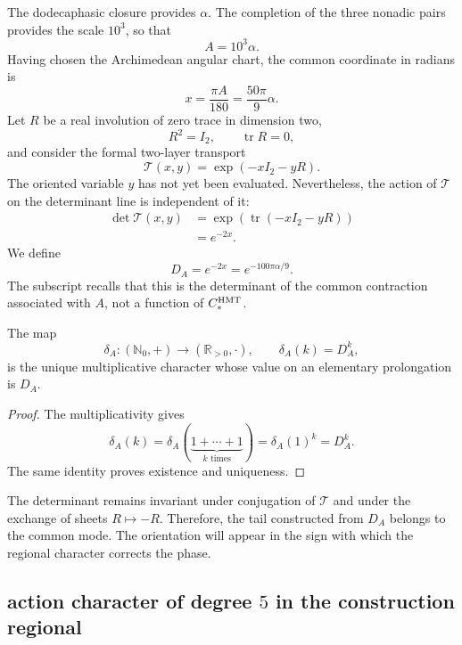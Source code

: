 
The dodecaphasic closure provides \(\alpha\). The completion of the three
nonadic pairs provides the scale \(10^3\), so that
\[
A=10^3\alpha.
\]
Having chosen the Archimedean angular chart, the common coordinate in radians is
\[
x=\frac{\pi A}{180}=\frac{50\pi}{9}\alpha.
\]
Let \(R\) be a real involution of zero trace in dimension two,
\[
R^2=I_2,
\qquad
\operatorname{tr}R=0,
\]
and consider the formal two-layer transport
\[
\mathcal T(x,y)=\exp(-xI_2-yR).
\]
The oriented variable \(y\) has not yet been evaluated. Nevertheless, the action
of \(\mathcal T\) on the determinant line is independent of it:
\[
\begin{aligned}
\det\mathcal T(x,y)
&=\exp\!\left(\operatorname{tr}(-xI_2-yR)\right)\\
&=e^{-2x}.
\end{aligned}
\]
We define
\[
\boxed{
D_A=e^{-2x}=e^{-100\pi\alpha/9}.}
\]
The subscript recalls that this is the determinant of the common contraction
associated with \(A\), not a function of \(C_*^{\rm HMT}\).

\begin{proposition}
\label{p3-83-c30-s1:prop:caracter-determinante}
The map
\[
\delta_A:(\mathbb N_0,+)\longrightarrow(\mathbb R_{>0},\cdot),
\qquad
\delta_A(k)=D_A^k,
\]
is the unique multiplicative character whose value on an elementary
prolongation is \(D_A\).
\end{proposition}

\begin{proof}
The multiplicativity gives
\[
\delta_A(k)
=\delta_A(\underbrace{1+\cdots+1}_{k\text{ times}})
=\delta_A(1)^k=D_A^k.
\]
The same identity proves existence and uniqueness.
\end{proof}

The determinant remains invariant under conjugation of
\(\mathcal T\) and under the exchange of sheets \(R\mapsto-R\). Therefore, the
tail constructed from \(D_A\) belongs to the common mode. The orientation
will appear in the sign with which the regional character corrects the phase.

\subsection{action character of degree \texorpdfstring{\(5\)}{5} in the construction regional}
\label{sec:s102:c38:3:2}

